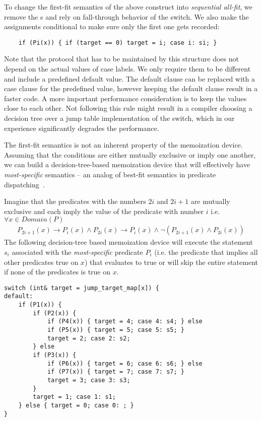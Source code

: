 To change the first-fit semantics of the above construct into \emph{sequential 
all-fit}, we remove the s and rely on fall-through behavior of the 
switch. We also make the assignments conditional to make sure only the first one 
gets recorded:

\begin{lstlisting}
    if (Pi(x)) { if (target == 0) target = i; case i: si; }
\end{lstlisting}

\noindent
Note that the protocol that has to be maintained by this structure does not 
depend on the actual values of case labels. We only require them to be 
different and include a predefined default value. The default clause can be 
replaced with a case clause for the predefined value, however keeping the default  
clause result in a faster code. A more important performance consideration is to 
keep the values close to each other. Not following this rule might result in a 
compiler choosing a decision tree over a jump table implementation of the 
switch, which in our experience significantly degrades the performance.

The first-fit semantics is not an inherent property of the memoization device. 
Assuming that the conditions are either mutually exclusive or imply one another, we 
can build a decision-tree-based memoization device that will effectively have 
\emph{most-specific} semantics -- an analog of best-fit semantics in predicate 
dispatching~\cite{ErnstKC98}.

Imagine that the predicates with the numbers $2i$ and $2i+1$ are mutually exclusive and 
each imply the value of the predicate with number $i$ i.e. $\forall x \in Domain(P)$
\begin{eqnarray*}
P_{2i+1}(x)\rightarrow P_i(x) \wedge P_{2i}(x)\rightarrow P_i(x) \wedge \neg(P_{2i+1}(x) \wedge P_{2i}(x))
\end{eqnarray*}
\noindent
The following decision-tree based memoization device will execute the statement 
$s_i$ associated with the \emph{most-specific} predicate $P_i$ (i.e. the 
predicate that implies all other predicates true on $x$) that evaluates to true or will 
skip the entire statement if none of the predicates is true on $x$.

\begin{lstlisting}
switch (int& target = jump_target_map[x]) {
default:
    if (P1(x)) {
        if (P2(x)) {
            if (P4(x)) { target = 4; case 4: s4; } else
            if (P5(x)) { target = 5; case 5: s5; } 
            target = 2; case 2: s2;
        } else
        if (P3(x)) {
            if (P6(x)) { target = 6; case 6: s6; } else
            if (P7(x)) { target = 7; case 7: s7; } 
            target = 3; case 3: s3;
        }
        target = 1; case 1: s1;
    } else { target = 0; case 0: ; }
}
\end{lstlisting}

